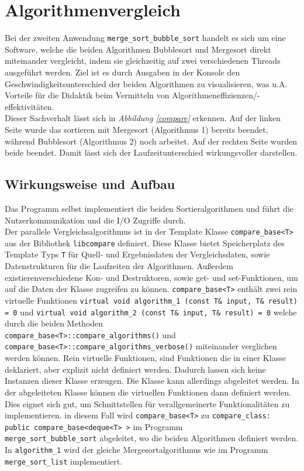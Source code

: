 \section{Algorithmenvergleich}
Bei der zweiten Anwendung \texttt{merge\_sort\_bubble\_sort} handelt es sich um eine Software, welche die beiden Algorithmen Bubblesort und Mergesort direkt miteinander vergleicht, indem sie gleichzeitig auf zwei verschiedenen Threads ausgeführt werden. Ziel ist es durch Ausgaben in der Konsole den Geschwindigkeitsunterschied der beiden Algorithmen zu visualisieren, was u.A. Vorteile für die Didaktik beim Vermitteln von Algorithmeneffizienzen/-effektivitäten.\\
Dieser Sachverhalt lässt sich in \textit{Abbildung \ref{compare}} erkennen. Auf der linken Seite wurde das sortieren mit Mergesort (Algorithmus 1) bereits beendet, während Bubblesort (Algorithmus 2) noch arbeitet. Auf der rechten Seite wurden beide beendet. Damit lässt sich der Laufzeitunterschied wirkungsvoller darstellen.

\subsection{Wirkungsweise und Aufbau}
Das Programm selbst implementiert die beiden Sortieralgorithmen und führt die Nutzerkommunikation und die \ac{I/O} Zugriffe durch.\\
Der parallele Vergleichsalgorithmus ist in der Template Klasse \texttt{compare\_base<T>} aus der Bibliothek \texttt{libcompare} definiert. Diese Klasse bietet Speicherplatz des Template Typs \texttt{T} für Quell- und Ergebnisdaten der Vergleichsdaten, sowie Datenstrukturen für die Laufzeiten der Algorithmen. Außerdem existierenverschiedene Kon- und Destruktoren, sowie get- und set-Funktionen, um auf die Daten der Klasse zugreifen zu können. \texttt{compare\_base<T>} enthält zwei rein virtuelle Funktionen \texttt{virtual void algorithm\_1 (const T\& input, T\& result) = 0} und \texttt{virtual void algorithm\_2 (const T\& input, T\& result) = 0} welche durch die  beiden Methoden\\ \texttt{compare\_base<T>::compare\_algorithms()} und \\ \texttt{compare\_base<T>::compare\_algorithms\_verbose()} miteinander verglichen werden können. Rein virtuelle Funktionen, sind Funktionen die in einer Klasse deklariert, aber explizit nicht definiert werden. Dadurch lassen sich keine Instanzen dieser Klasse erzeugen. Die Klasse kann allerdings abgeleitet werden. In der abgeleiteten Klasse können die virtuellen Funktionen dann definiert werden. Dies eignet sich gut, um Schnittstellen für verallgemeinerte Funktionalitäten zu implementieren. in diesem Fall wird \texttt{compare\_base<T>} zu \texttt{compare\_class: public compare\_base<deque<T> >} im Programm\\ \texttt{merge\_sort\_bubble\_sort} abgeleitet, wo die beiden Algorithmen definiert werden.\\
In \texttt{algorithm\_1} wird der gleiche Mergesortalgorithmus wie im Programm \texttt{merge\_sort\_list} implementiert.

